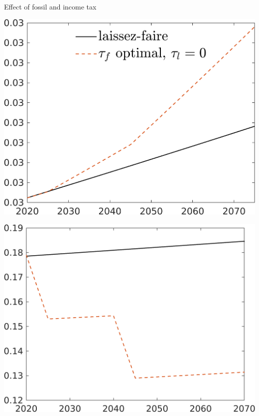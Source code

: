 \documentclass[11pt,aspectratio=169]{beamer}
\begin{document}
\begin{frame}{Effect of fossil and income tax}
	\centering
	\begin{minipage}[]{0.3\textwidth}
		\includegraphics[width=1\textwidth]{../codding_model/own_basedOnFried/optimalPol_elastS_DisuSci/figures/all_1705/CompCounterFac_withLF_noopt_taufopt1_taulopt0_AgAf_spillover0_noskill0_sep1_BN0_ineq0_red0_xgrowth0_etaa0.79_lgd1.png}
	\end{minipage}
	\begin{minipage}[]{0.3\textwidth}
		\includegraphics[width=1\textwidth]{../codding_model/own_basedOnFried/optimalPol_elastS_DisuSci/figures/all_1705/CompCounterFac_withLF_noopt_taufopt1_taulopt0_gAagg_spillover0_noskill0_sep1_BN0_ineq0_red0_xgrowth0_etaa0.79_lgd0.png}

\end{minipage}
\end{frame}
\end{document}
